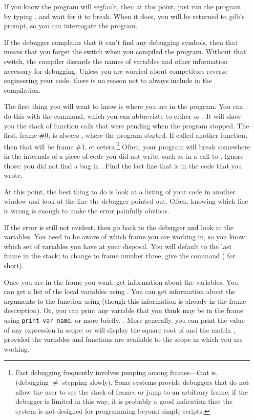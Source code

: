 \documentclass[12pt]{article}
\def\ind#1{\index{#1}#1}
\begin{document}
If you know the program will segfault, then at this point, just run the program
by typing , and wait for it to break. When it does, you will
be returned to gdb's prompt, so you can interrogate the 
program. 

If the debugger complains that it can't find
any debugging symbols, then that means that you forget the 
switch when you compiled the program. Without that switch, the compiler
discards the names of variables and other information necessary for
debugging. Unless you are worried about competitors reverse-engineering
your code, there is no reason not to always include  in the
compilation.

The first thing you will want to know is where you are in the program. You
can do this with the  command, which you can abbreviate to
either  or . It will show you the \ind{stack} of function
calls that were pending when the program stopped.  The first, frame
\#0, is always , where the program started. If 
called another function, then that will be frame \#1, et
cetera.\footnote{Fast debugging frequently involves jumping among
frames---that is, (debugging $\neq$ stepping slowly).
Some systems provide debuggers that do not allow the user to see the
stack of frames or jump to an arbitrary frame; if the debugger is limited in
this way, it is probably a good indication that the system is not designed
for programming beyond simple scripts.} Often, your program will break
somewhere in the internals of a piece of code you did not write, such
as in a call to . Ignore those: you did not find a bug in
. Find the last line that is in the code that you wrote.

At this point, the best thing to do is look at a listing of your code
in another window and look at the line the debugger pointed out. Often,
knowing which line is wrong is enough to make the error painfully obvious.


If the error is still not evident, then go back to the debugger and look
at the variables. You need to be aware of which frame you are working in,
so you know which set of variables you have at your disposal.  You
will default to the last frame in the stack; to change to frame number
three, give the command  ( for short).

Once you are in the frame you want, get information about the
variables. You can get a list of the local variables using . You can get information about the arguments to the function
using  (though this information is already in the frame
description). Or, you can print any variable that you think may be in the
frame using {\tt print var\_name}, or more briefly, .
More generally, you can print the value of any expression in scope:
 or  will display the square
root of  and the matrix , provided the variables and
functions are available to the scope in which you are working.
\end{document}
